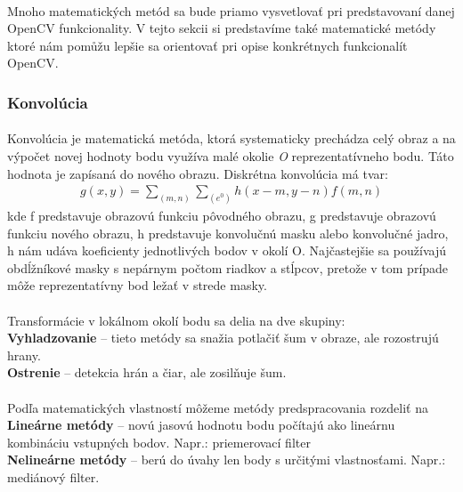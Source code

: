\documentclass[12pt]{article}
\begin{document}
\paragraph{}
Mnoho matematických metód sa bude priamo vysvetlovať pri predstavovaní danej OpenCV funkcionality.
V tejto sekcii si predstavíme také matematické metódy ktoré nám pomůžu lepšie sa orientovať pri opise konkrétnych funkcionalít OpenCV.
\subsubsection{Konvolúcia}
\paragraph{}
Konvolúcia je matematická metóda, ktorá systematicky prechádza celý obraz a na výpočet novej hodnoty bodu využíva malé okolie \emph{O} reprezentatívneho bodu. 
Táto hodnota je zapísaná do nového obrazu. Diskrétna konvolúcia má tvar:
\begin{align*}
g(x,y) = \sum_{(m,n)} \sum_{(e^0)} h(x - m,y - n)f(m,n)
\end{align*}
kde f predstavuje obrazovú funkciu pôvodného obrazu, g predstavuje obrazovú funkciu nového obrazu, h predstavuje konvolučnú masku alebo konvolučné jadro, h nám udáva koeficienty jednotlivých bodov v okolí O.
Najčastejšie sa používajú  obdĺžníkové masky s nepárnym počtom riadkov a stĺpcov, pretože v tom prípade môže reprezentatívny bod ležať v strede masky.
\paragraph{}
Transformácie v lokálnom okolí bodu sa delia na dve skupiny: \\
\textbf{Vyhladzovanie} – tieto metódy sa snažia potlačiť šum v obraze, ale rozostrujú hrany. \\
\textbf{Ostrenie} – detekcia hrán a čiar, ale zosilňuje šum. \\
\paragraph{}
Podľa matematických vlastností môžeme metódy predspracovania rozdeliť na \\
\textbf{Lineárne metódy} – novú jasovú hodnotu bodu počítajú ako lineárnu kombináciu vstupných bodov. Napr.: priemerovací filter \\
\textbf{Nelineárne metódy} – berú do úvahy len body s určitými vlastnosťami. Napr.: mediánový filter.
\cite{DIP}
\end{document}
